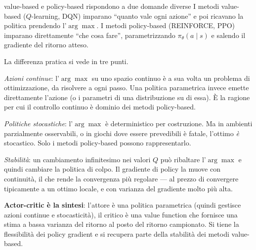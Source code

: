 \begin{intuizione}{value-based e policy-based rispondono a due domande diverse}
I metodi value-based ($Q$-learning, DQN) imparano ``quanto vale ogni azione'' e poi ricavano la politica prendendo l'$\arg\max$. I metodi policy-based (REINFORCE, PPO) imparano direttamente ``che cosa fare'', parametrizzando $\pi_\theta(a \mid s)$ e salendo il gradiente del ritorno atteso.

La differenza pratica si vede in tre punti.

\emph{Azioni continue}: l'$\arg\max$ su uno spazio continuo è a sua volta un problema di ottimizzazione, da risolvere a ogni passo. Una politica parametrica invece emette direttamente l'azione (o i parametri di una distribuzione su di essa). È la ragione per cui il controllo continuo è dominio dei metodi policy-based.

\emph{Politiche stocastiche}: l'$\arg\max$ è deterministico per costruzione. Ma in ambienti parzialmente osservabili, o in giochi dove essere prevedibili è fatale, l'ottimo \emph{è} stocastico. Solo i metodi policy-based possono rappresentarlo.

\emph{Stabilità}: un cambiamento infinitesimo nei valori $Q$ può ribaltare l'$\arg\max$ e quindi cambiare la politica di colpo. Il gradiente di policy la muove con continuità, il che rende la convergenza più regolare — al prezzo di convergere tipicamente a un ottimo locale, e con varianza del gradiente molto più alta.

\textbf{Actor-critic è la sintesi}: l'attore è una politica parametrica (quindi gestisce azioni continue e stocasticità), il critico è una value function che fornisce una stima a bassa varianza del ritorno al posto del ritorno campionato. Si tiene la flessibilità dei policy gradient e si recupera parte della stabilità dei metodi value-based.
\end{intuizione}

